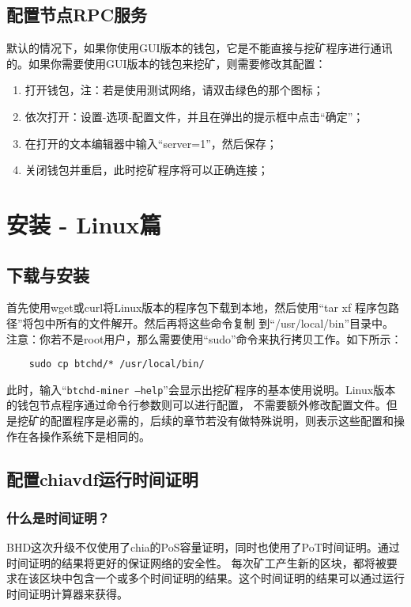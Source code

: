\subsection{配置节点RPC服务}
\begin{flushleft}
    默认的情况下，如果你使用GUI版本的钱包，它是不能直接与挖矿程序进行通讯的。如果你需要使用GUI版本的钱包来挖矿，则需要修改其配置：
\end{flushleft}
\begin{enumerate}
    \item 打开钱包，注：若是使用测试网络，请双击绿色的那个图标；
    \item 依次打开：设置-选项-配置文件，并且在弹出的提示框中点击``确定''；
    \item 在打开的文本编辑器中输入``server=1''，然后保存；
    \item 关闭钱包并重启，此时挖矿程序将可以正确连接；
\end{enumerate}
\section{安装 - Linux篇}
\subsection{下载与安装}
\begin{flushleft}
    首先使用wget或curl将Linux版本的程序包下载到本地，然后使用``tar xf 程序包路径''将包中所有的文件解开。然后再将这些命令复制
    到``/usr/local/bin''目录中。注意：你若不是root用户，那么需要使用``sudo''命令来执行拷贝工作。如下所示：
\end{flushleft}
\begin{verbatim}
    sudo cp btchd/* /usr/local/bin/
\end{verbatim}
\begin{flushleft}
    此时，输入``\texttt{btchd-miner --help}''会显示出挖矿程序的基本使用说明。Linux版本的钱包节点程序通过命令行参数则可以进行配置，
    不需要额外修改配置文件。但是挖矿的配置程序是必需的，后续的章节若没有做特殊说明，则表示这些配置和操作在各操作系统下是相同的。
\end{flushleft}
\subsection{配置chiavdf运行时间证明}
\subsubsection{什么是时间证明？}
\begin{flushleft}
    BHD这次升级不仅使用了chia的PoS容量证明，同时也使用了PoT时间证明。通过时间证明的结果将更好的保证网络的安全性。
    每次矿工产生新的区块，都将被要求在该区块中包含一个或多个时间证明的结果。这个时间证明的结果可以通过运行时间证明计算器来获得。
\end{flushleft}
